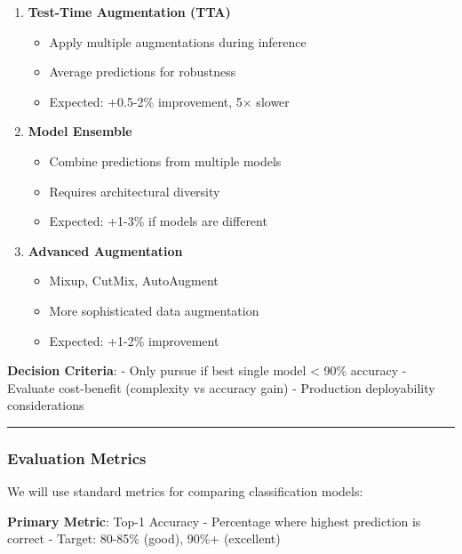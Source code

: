 \documentclass[
  letterpaper,
  DIV=11,
  numbers=noendperiod]{scrartcl}
\providecommand{\tightlist}{%
  \setlength{\itemsep}{0pt}\setlength{\parskip}{0pt}}
\begin{document}
\begin{enumerate}
\def\labelenumi{\arabic{enumi}.}
\tightlist
\item
  \textbf{Test-Time Augmentation (TTA)}

  \begin{itemize}
  \tightlist
  \item
    Apply multiple augmentations during inference
  \item
    Average predictions for robustness
  \item
    Expected: +0.5-2\% improvement, 5× slower
  \end{itemize}
\item
  \textbf{Model Ensemble}

  \begin{itemize}
  \tightlist
  \item
    Combine predictions from multiple models
  \item
    Requires architectural diversity
  \item
    Expected: +1-3\% if models are different
  \end{itemize}
\item
  \textbf{Advanced Augmentation}

  \begin{itemize}
  \tightlist
  \item
    Mixup, CutMix, AutoAugment
  \item
    More sophisticated data augmentation
  \item
    Expected: +1-2\% improvement
  \end{itemize}
\end{enumerate}

\textbf{Decision Criteria}: - Only pursue if best single model
\textless{} 90\% accuracy - Evaluate cost-benefit (complexity vs
accuracy gain) - Production deployability considerations

\begin{center}\rule{0.5\linewidth}{0.5pt}\end{center}

\subsubsection{Evaluation Metrics}\label{evaluation-metrics}

We will use standard metrics for comparing classification models:

\textbf{Primary Metric}: Top-1 Accuracy - Percentage where highest
prediction is correct - Target: 80-85\% (good), 90\%+ (excellent)
\end{document}
